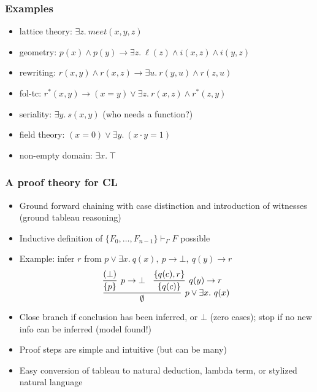 \documentclass[handout,11pt]{beamer}
\newcommand{\set}[1]{\{#1\}}
\begin{document}
\begin{frame}
\frametitle{Examples}
 \begin{itemize}[<+->]   %
    \item lattice theory: $%
    \exists z.~\mathit{meet}(x,y,z)$
    \item geometry: $%
    p(x)\land p(y) \to \exists z.~\ell(z) \land i(x,z) \land i(y,z)$
    \item rewriting: $%
    r(x,y)\land r(x,z) \to \exists u.~r(y,u)\land r(z,u)$
    \item fol-tc: $%
    r^*(x,y)\to (x=y)\lor\exists z.~r(x,z)\land r^*(z,y)$     
    \item seriality: $%
    \exists y.~s(x,y)$ (who needs a function?)
    \item field theory: $%
    (x=0) \lor \exists y.~(x\cdot y=1)$
    \item non-empty domain: $\exists x.~\top$
 \end{itemize}
\end{frame}

\begin{frame}
\frametitle{A proof theory for CL}
 \begin{itemize}[<+->]   %
    \item Ground forward chaining with case distinction and introduction of witnesses
(ground tableau reasoning)
    \item Inductive definition of $\set{F_0,\ldots,F_{n-1}}\vdash_\Gamma F$ possible %
    \item Example: infer $r$ from $p\lor \exists x.~q(x),~p\to\bot,~q(y)\to r$
    \[
\infer[p\vee \exists x.~q(x)]{\emptyset}
{
\infer[p\to\bot]{\set{p}}{(\bot)} & \infer[q(y)\to r]{\set{q(c)}}{\set{q(c),r}}
}
\]
    \item Close branch if conclusion has been inferred,
    or $\bot$ (zero cases); stop if no new info can be inferred (model found!) 
    \item Proof steps are simple and intuitive (but can be many)
    \item Easy conversion of tableau to natural deduction, lambda term, or stylized natural language
 \end{itemize}
\end{frame}
\end{document}
